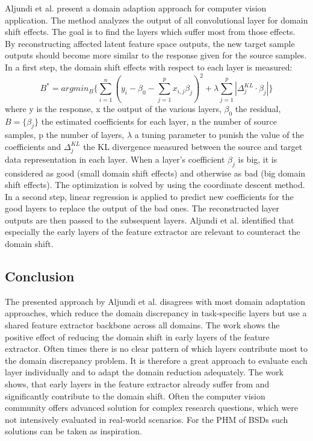 Aljundi et al. \cite{Aljundi2016} present a domain adaption approach for computer vision application. The method analyzes the output of all convolutional layer for domain shift effects. The goal is to find the layers which suffer most from those effects. By reconstructing affected latent feature space outputs, the new target sample outputs should become more similar to the response given for the source samples. In a first step, the domain shift effects with respect to each layer is measured:
\begin{equation}
    B^{*} = argmin_{B} \{ \sum_{i=1}^{n}( y_{i}-\beta_{0}-\sum_{j=1}^{p}x_{i,j}\beta_{j})^{2} + \lambda \sum_{j=1}^{p}|\Delta_{j}^{KL}\cdot \beta_{j}| \}
\end{equation}
where y is the response, x the output of the various layers, $\beta_{0}$ the residual, $B = \{\beta_{j}\}$ the estimated coefficients for each layer, n the number of
source samples, p the number of layers, $\lambda$ a tuning parameter to punish the value of the coefficients and $\Delta_{j}^{KL}$ the KL divergence measured between the source and target data representation in each layer. When a layer's coefficient  $\beta_{j}$ is big, it is considered as good (small domain shift effects) and otherwise as bad (big domain shift effects). The optimization is solved by using the coordinate descent method. In a second step, linear regression is applied to predict new coefficients for the good layers to replace the output of the bad ones. The reconstructed layer outputs are then passed to the subsequent layers. Aljundi et al. \cite{Aljundi2016} identified that especially the early layers of the feature extractor are relevant to counteract the domain shift.

\subsection{Conclusion}
The presented approach by Aljundi et al. \cite{Aljundi2016} disagrees with most domain adaptation approaches, which reduce the domain discrepancy in task-specific layers but use a shared feature extractor backbone across all domains. The work shows the positive effect of reducing the domain shift in early layers of the feature extractor. Often times there is no clear pattern of which layers contribute most to the domain discrepancy problem. It is therefore a great approach to evaluate each layer individually and to adapt the domain reduction adequately. The work shows, that early layers in the feature extractor already suffer from and significantly contribute to the domain shift. Often the computer vision community offers advanced solution for complex research questions, which were not intensively evaluated in real-world scenarios. For the PHM of BSDs such solutions can be taken as inspiration. 